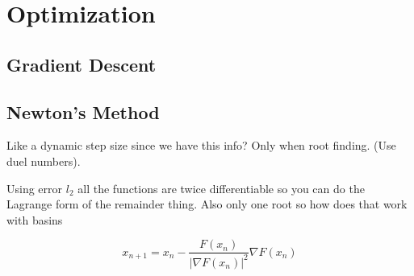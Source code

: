 
\chapter{Optimization}
\section{Gradient Descent}
\section{Newton's Method}
Like a dynamic step size since we have this info?
Only when root finding.
(Use duel numbers).

Using error $l_2$ all the functions are twice differentiable so you can do the Lagrange form of the remainder thing.
Also only one root so how does that work with basins 

\[x_{n+1} = x_n - \frac{F(x_n)}{|\nabla F(x_n)|^2}\nabla F(x_n)\]
